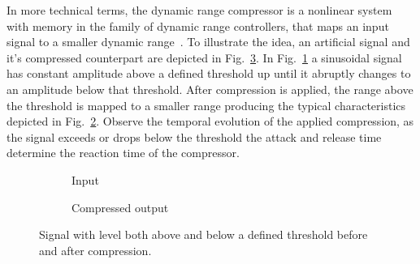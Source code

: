 \documentclass[../main2.tex]{subfiles}
\providecommand{\rootdir}{..}
\begin{document}
In more technical terms, the dynamic range compressor is a nonlinear system with memory in the family of dynamic range controllers, that maps an input signal to a smaller dynamic range~\cite{dafx11}. To illustrate the idea, an artificial signal and it's compressed counterpart are depicted in Fig.~\ref{fig:comp_inout}. In Fig.~\ref{fig:comp_input} a sinusoidal signal has constant amplitude above a defined threshold up until it abruptly changes to an amplitude below that threshold. After compression is applied, the range above the threshold is mapped to a smaller range producing the typical characteristics depicted in Fig.~\ref{fig:comp_output}. Observe the temporal evolution of the applied compression, as the signal exceeds or drops below the threshold the attack and release time determine the reaction time of the compressor.
\begin{figure}[ht]
\captionsetup{justification=centering}
\begin{subfigure}{.5\linewidth}
 \centering

\caption{Input} 
\label{fig:comp_input}
\end{subfigure}
\begin{subfigure}{.5\linewidth}
\centering

\caption{Compressed output} 
\label{fig:comp_output}
\end{subfigure}
\caption{Signal with level both above and below a defined threshold before and after compression.} 
\label{fig:comp_inout}
\end{figure}
%
%
%
\end{document}
